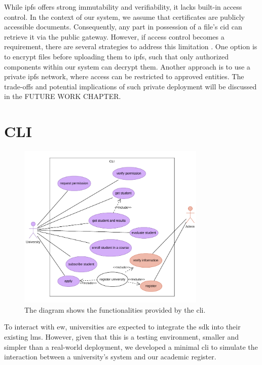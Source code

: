 While \acrshort{ipfs} offers strong immutability and verifiability, it lacks built-in access control. In the context of our system, we assume that certificates are publicly accessible documents. Consequently, any part in possession of a file's \acrshort{cid} can retrieve it via the public gateway. However, if access control becomes a requirement, there are several strategies to address this limitation \cite{barbaraanrealaura2021datapersistence}. One option is to encrypt files before uploading them to \acrshort{ipfs}, such that only authorized components within our system can decrypt them. Another approach is to use a private \acrshort{ipfs} network, where access can be restricted to approved entities. The trade-offs and potential implications of such private deployment will be discussed in the FUTURE WORK CHAPTER.

\section{CLI}
\label{sec:cliDesign}
\begin{figure}
  \centering
  \includegraphics[width=0.8\textwidth]{figures/CLI use case diagram.pdf}
  \caption[Use case diagram representing the functionalities provided by the \acrshort{cli}]{The diagram shows the functionalities provided by the \acrshort{cli}.}
  \label{fig:useCaseCli}
\end{figure}
To interact with \acrshort{ew}, universities are expected to integrate the \acrshort{sdk} into their existing \acrshort{lms}. However, given that this is a testing environment, smaller and simpler than a real-world deployment, we developed a minimal \acrlong{cli} to simulate the interaction between a university's system and our academic register.

